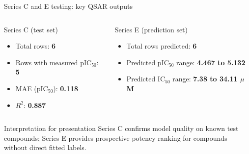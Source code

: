 \documentclass[aspectratio=169,10pt]{beamer}
\begin{document}
\begin{frame}{Series C and E testing: key QSAR outputs}
  \begin{columns}[T]
      \begin{block}{Series C (test set)}
        \begin{itemize}
          \item Total rows: \textbf{6}
          \item Rows with measured pIC\(_{50}\): \textbf{5}
          \item MAE (pIC\(_{50}\)): \textbf{0.118}
          \item \(R^2\): \textbf{0.887}
        \end{itemize}
      \end{block}
      \begin{block}{Series E (prediction set)}
        \begin{itemize}
          \item Total rows predicted: \textbf{6}
          \item Predicted pIC\(_{50}\) range: \textbf{4.467 to 5.132}
          \item Predicted IC\(_{50}\) range: \textbf{7.38 to 34.11 \(\mu\)M}
        \end{itemize}
      \end{block}
  \end{columns}

  \vspace{4pt}
  \begin{alertblock}{Interpretation for presentation}
    Series C confirms model quality on known test compounds; Series E provides
    prospective potency ranking for compounds without direct fitted labels.
  \end{alertblock}
\end{frame}
\end{document}
